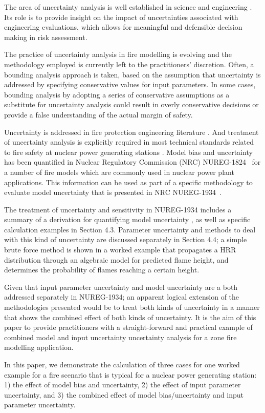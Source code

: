 
The area of uncertainty analysis is well established in science and engineering \cite{Morgan}.  Its role is to provide insight on the impact of uncertainties associated with engineering evaluations, which allows for meaningful and defensible decision making in risk assessment.

The practice of uncertainty analysis in fire modelling is evolving and the methodology employed is currently left to the practitioners' discretion. Often, a bounding analysis approach is taken, based on the assumption that uncertainty is addressed by specifying conservative values for input parameters. In some cases, bounding analysis by adopting a series of conservative assumptions as a substitute for uncertainty analysis could result in overly conservative decisions or provide a false understanding of the actual margin of safety. 

Uncertainty is addressed in fire protection engineering literature \cite{Notarianni:SFPE}.  And treatment of uncertainty analysis is explicitly required in most technical standards related to fire safety at nuclear power generating stations \cite{NFPA:805, NUREG:6850}.  Model bias and uncertainty has been quantified in Nuclear Regulatory Commission (NRC) NUREG-1824~\cite{NUREG_1824_Sup_1} for a number of fire models which are commonly used in nuclear power plant applications. This information can be used as part of a specific methodology to evaluate model uncertainty  that is presented in NRC NUREG-1934~\cite{NUREG_1934}. 

The treatment of  uncertainty and sensitivity in NUREG-1934 includes a summary of a derivation for quantifying model uncertainty \cite{McGrattan2011a}, as well as specific calculation examples in Section 4.3. Parameter uncertainty and methods to deal with this kind of uncertainty are discussed separately in Section 4.4; a simple brute force method is shown in  a worked example that propagates a HRR distribution through an algebraic model for predicted flame height, and determines the probability of flames reaching a certain height.

Given that input parameter uncertainty and model uncertainty are a both addressed separately in NUREG-1934; an apparent logical extension of the methodologies presented would be to treat both kinds of uncertainty in a manner that shows the combined effect of both kinds of uncertainty.  It is the aim of this paper to provide practitioners with a straight-forward and practical example of combined model and input uncertainty uncertainty analysis for a zone fire modelling application. 

In this paper, we demonstrate the calculation of three cases for one worked example for a fire scenario that is typical for a nuclear power generating station: 1) the effect of model bias and uncertainty, 2) the effect of input parameter uncertainty, and 3) the combined effect of model bias/uncertainty and input parameter uncertainty. 

